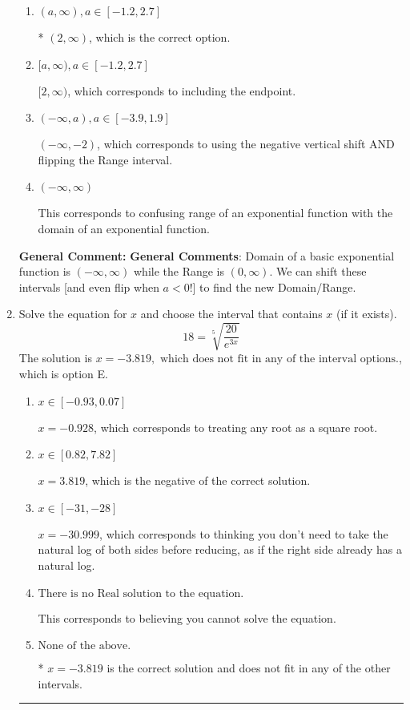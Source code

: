 \documentclass{extbook}[14pt]
\newcommand{\litem}[1]{\item #1

\rule{\textwidth}{0.4pt}}
\begin{document}
\begin{enumerate}
{\begin{enumerate}[label=\Alph*.]
$(-\infty, -2]$, which corresponds to using the negative vertical shift AND flipping the Range interval AND including the endpoint.
\item \( (a, \infty), a \in [-1.2, 2.7] \)

* $(2, \infty)$, which is the correct option.
\item \( [a, \infty), a \in [-1.2, 2.7] \)

$[2, \infty)$, which corresponds to including the endpoint.
\item \( (-\infty, a), a \in [-3.9, 1.9] \)

$(-\infty, -2)$, which corresponds to using the negative vertical shift AND flipping the Range interval.
\item \( (-\infty, \infty) \)

This corresponds to confusing range of an exponential function with the domain of an exponential function.
\end{enumerate}

\textbf{General Comment:} \textbf{General Comments}: Domain of a basic exponential function is $(-\infty, \infty)$ while the Range is $(0, \infty)$. We can shift these intervals [and even flip when $a<0$!] to find the new Domain/Range.
}
\litem{
 Solve the equation for $x$ and choose the interval that contains $x$ (if it exists).
\[  18 = \sqrt[5]{\frac{20}{e^{3x}}} \]The solution is \( x = -3.819, \text{ which does not fit in any of the interval options.} \), which is option E.\begin{enumerate}[label=\Alph*.]
\item \( x \in [-0.93, 0.07] \)

$x = -0.928$, which corresponds to treating any root as a square root.
\item \( x \in [0.82, 7.82] \)

$x = 3.819$, which is the negative of the correct solution.
\item \( x \in [-31, -28] \)

$x = -30.999$, which corresponds to thinking you don't need to take the natural log of both sides before reducing, as if the right side already has a natural log.
\item \( \text{There is no Real solution to the equation.} \)

This corresponds to believing you cannot solve the equation.
\item \( \text{None of the above.} \)

* $x = -3.819$ is the correct solution and does not fit in any of the other intervals.
\end{enumerate}

}
\end{enumerate}
\end{document}
